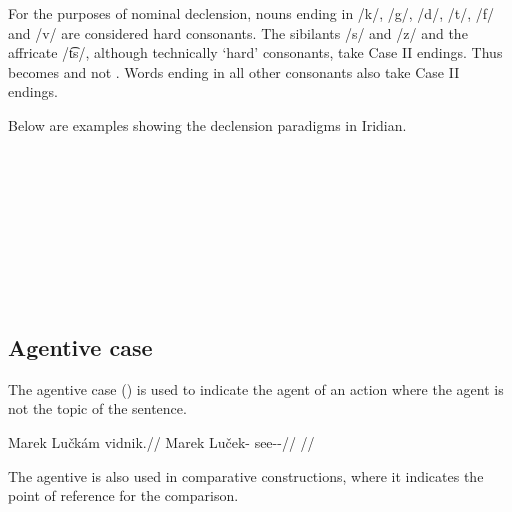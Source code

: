 For the purposes of nominal declension, nouns ending in /k/, /g/, /d/, /t/, /f/
and /v/ are considered hard consonants. The sibilants /s/ and /z/ and the
affricate /t͡s/, although technically `hard' consonants, take Case II endings.
Thus  becomes  and not . Words ending in
all other consonants also take Case II endings. 

Below are examples showing the declension paradigms in Iridian.

\pex
\a {}\\

\a {}\\


\a {}\\

\a {}\\

\a {}\\

\xe 


\subsection{Agentive case}

The agentive case (\Agt{}) is used to indicate the agent of an action where the agent is not the topic of the sentence.

\pex
\begingl
\gla Marek Lučkám vidnik.//
\glb Marek Luček-\Agt{} see-\Pv{}-\Pf{}//
\glft {}//
\endgl
\xe

The agentive is also used in comparative constructions, where it indicates the point of reference for the comparison.

